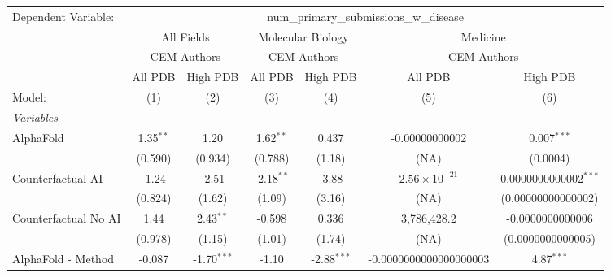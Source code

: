 \begingroup
\centering
\begin{tabular}{lcccccc}
   \tabularnewline \midrule \midrule
   Dependent Variable: & \multicolumn{6}{c}{num\_primary\_submissions\_w\_disease}\\
 & \multicolumn{2}{c}{All Fields} & \multicolumn{2}{c}{Molecular Biology} & \multicolumn{2}{c}{Medicine} \\
\cmidrule(lr){2-3} \cmidrule(lr){4-5} \cmidrule(lr){6-7}
 & \multicolumn{2}{c}{CEM Authors} & \multicolumn{2}{c}{CEM Authors} & \multicolumn{2}{c}{CEM Authors} \\
\cmidrule(lr){2-3} \cmidrule(lr){4-5} \cmidrule(lr){6-7}
 & \multicolumn{1}{c}{All PDB} & \multicolumn{1}{c}{High PDB} & \multicolumn{1}{c}{All PDB} & \multicolumn{1}{c}{High PDB} & \multicolumn{1}{c}{All PDB} & \multicolumn{1}{c}{High PDB} \\
\cmidrule(lr){2-2} \cmidrule(lr){3-3} \cmidrule(lr){4-4} \cmidrule(lr){5-5} \cmidrule(lr){6-6} \cmidrule(lr){7-7}
   Model:                                                     & (1)          & (2)           & (3)          & (4)           & (5)                    & (6)\\  
   \midrule
   \emph{Variables}\\
   AlphaFold                                                  & 1.35$^{**}$  & 1.20          & 1.62$^{**}$  & 0.437         & -0.00000000002         & 0.007$^{***}$\\   
                                                              & (0.590)      & (0.934)       & (0.788)      & (1.18)        & (NA)                   & (0.0004)\\   
   Counterfactual AI                                          & -1.24        & -2.51         & -2.18$^{**}$ & -3.88         & $2.56\times 10^{-21}$  & 0.0000000000002$^{***}$\\   
                                                              & (0.824)      & (1.62)        & (1.09)       & (3.16)        & (NA)                   & (0.00000000000002)\\   
   Counterfactual No AI                                       & 1.44         & 2.43$^{**}$   & -0.598       & 0.336         & 3,786,428.2            & -0.0000000000006\\   
                                                              & (0.978)      & (1.15)        & (1.01)       & (1.74)        & (NA)                   & (0.0000000000005)\\   
   AlphaFold - Method                                         & -0.087       & -1.70$^{***}$ & -1.10        & -2.88$^{***}$ & -0.0000000000000000003 & 4.87$^{***}$\\   

\end{tabular}
